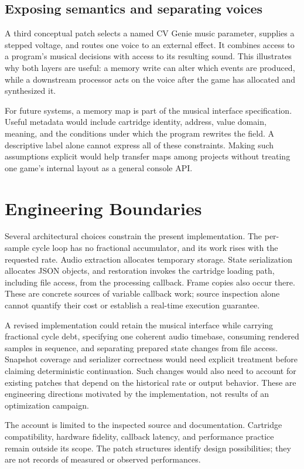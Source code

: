 \documentclass[10pt,letterpaper,twocolumn]{article}
\begin{document}
\subsection{Exposing semantics and separating voices}
A third conceptual patch selects a named CV Genie music parameter, supplies
a stepped voltage, and routes one voice to an external effect. It combines
access to a program's musical decisions with access to its resulting sound.
This illustrates why both layers are useful: a memory write can alter which
events are produced, while a downstream processor acts on the voice after
the game has allocated and synthesized it.

For future systems, a memory map is part of the musical interface specification.
Useful metadata would include cartridge identity, address, value domain,
meaning, and the conditions under which the program rewrites the field. A
descriptive label alone cannot express all of these constraints. Making such
assumptions explicit would help transfer maps among projects without treating
one game's internal layout as a general console API.

\section{Engineering Boundaries}
Several architectural choices constrain the present implementation. The
per-sample cycle loop has no fractional accumulator, and its work rises with
the requested rate. Audio extraction allocates temporary storage. State
serialization allocates JSON objects, and restoration invokes the cartridge
loading path, including file access, from the processing callback. Frame
copies also occur there. These are concrete sources of variable callback work;
source inspection alone cannot quantify their cost or establish a real-time
execution guarantee.

A revised implementation could retain the musical interface while carrying
fractional cycle debt, specifying one coherent audio timebase, consuming
rendered samples in sequence, and separating prepared state changes from
file access. Snapshot coverage and serializer correctness would need
explicit treatment before claiming deterministic continuation. Such changes
would also need to account for existing patches that depend on the historical
rate or output behavior. These are engineering directions motivated by the
implementation, not results of an optimization campaign.

The account is limited to the inspected source and documentation. Cartridge
compatibility, hardware fidelity, callback latency, and performance practice
remain outside its scope. The patch structures identify design possibilities;
they are not records of measured or observed performances.
\end{document}
